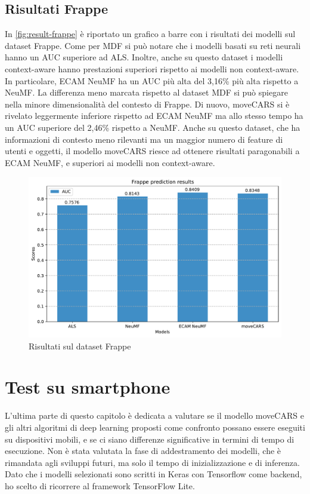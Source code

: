 \documentclass[12pt,italian]{report}
\begin{document}
\subsection{Risultati Frappe}
In \autoref{fig:result-frappe} è riportato un grafico a barre con i risultati dei modelli sul dataset Frappe. Come per MDF si può notare che i modelli basati su reti neurali hanno un AUC superiore ad ALS. Inoltre, anche su questo dataset i modelli context-aware hanno prestazioni superiori rispetto ai modelli non context-aware. In particolare, ECAM NeuMF ha un AUC più alta del 3,16\% più alta rispetto a NeuMF. La differenza meno marcata rispetto al dataset MDF si può spiegare nella minore dimensionalità del contesto di Frappe. Di nuovo, moveCARS si è rivelato leggermente inferiore rispetto ad ECAM NeuMF ma allo stesso tempo ha un AUC superiore del 2,46\% rispetto a NeuMF. Anche su questo dataset, che ha informazioni di contesto meno rilevanti ma un maggior numero di feature di utenti e oggetti, il modello moveCARS riesce ad ottenere risultati paragonabili a ECAM NeuMF, e superiori ai modelli non context-aware.

\begin{figure}
  \centering
  \includegraphics[width=\linewidth]{immagini/frappe_test_results.pdf}
  \caption{Risultati sul dataset Frappe}
  \label{fig:result-frappe}
\end{figure}

\section{Test su smartphone} \label{sec:smartphone}
L'ultima parte di questo capitolo è dedicata a valutare se il modello moveCARS e gli altri algoritmi di deep learning proposti come confronto possano essere eseguiti su dispositivi mobili, e se ci siano differenze significative in termini di tempo di esecuzione. Non è stata valutata la fase di addestramento dei modelli, che è rimandata agli sviluppi futuri, ma solo il tempo di inizializzazione e di inferenza. Dato che i modelli selezionati sono scritti in Keras con Tensorflow come backend, ho scelto di ricorrere al framework TensorFlow Lite. 
\end{document}
